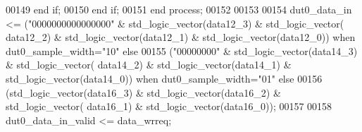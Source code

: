 \begin{DoxyCode}
00149          \textcolor{keywordflow}{end} \textcolor{keywordflow}{if};
00150       \textcolor{keywordflow}{end} \textcolor{keywordflow}{if};
00151    \textcolor{keywordflow}{end} \textcolor{keywordflow}{process};
00152    
00153    
00154    \textcolor{vhdlchar}{dut0_data_in} \textcolor{vhdlchar}{<=}   \textcolor{vhdlchar}{(}\textcolor{vhdllogic}{"0000000000000000"} \textcolor{vhdlchar}{&} \textcolor{comment}{std\_logic\_vector}\textcolor{vhdlchar}{(}\textcolor{vhdlchar}{data12_3}\textcolor{vhdlchar}{)} \textcolor{vhdlchar}{&} \textcolor{comment}{std\_logic\_vector}\textcolor{vhdlchar}{(}\textcolor{vhdlchar}{
      data12_2}\textcolor{vhdlchar}{)} \textcolor{vhdlchar}{&} \textcolor{comment}{std\_logic\_vector}\textcolor{vhdlchar}{(}\textcolor{vhdlchar}{data12_1}\textcolor{vhdlchar}{)} \textcolor{vhdlchar}{&} \textcolor{comment}{std\_logic\_vector}\textcolor{vhdlchar}{(}\textcolor{vhdlchar}{data12_0}\textcolor{vhdlchar}{)}\textcolor{vhdlchar}{)} \textcolor{keywordflow}{when} \textcolor{vhdlchar}{
      dut0_sample_width}\textcolor{vhdlchar}{=}\textcolor{vhdllogic}{"10"} \textcolor{keywordflow}{else} 
00155                      \textcolor{vhdlchar}{(}\textcolor{vhdllogic}{"00000000"} \textcolor{vhdlchar}{&} \textcolor{comment}{std\_logic\_vector}\textcolor{vhdlchar}{(}\textcolor{vhdlchar}{data14_3}\textcolor{vhdlchar}{)} \textcolor{vhdlchar}{&} \textcolor{comment}{std\_logic\_vector}\textcolor{vhdlchar}{(}\textcolor{vhdlchar}{
      data14_2}\textcolor{vhdlchar}{)} \textcolor{vhdlchar}{&} \textcolor{comment}{std\_logic\_vector}\textcolor{vhdlchar}{(}\textcolor{vhdlchar}{data14_1}\textcolor{vhdlchar}{)} \textcolor{vhdlchar}{&} \textcolor{comment}{std\_logic\_vector}\textcolor{vhdlchar}{(}\textcolor{vhdlchar}{data14_0}\textcolor{vhdlchar}{)}\textcolor{vhdlchar}{)} \textcolor{keywordflow}{when} \textcolor{vhdlchar}{
      dut0_sample_width}\textcolor{vhdlchar}{=}\textcolor{vhdllogic}{"01"} \textcolor{keywordflow}{else} 
00156                      \textcolor{vhdlchar}{(}\textcolor{comment}{std\_logic\_vector}\textcolor{vhdlchar}{(}\textcolor{vhdlchar}{data16_3}\textcolor{vhdlchar}{)} \textcolor{vhdlchar}{&} \textcolor{comment}{std\_logic\_vector}\textcolor{vhdlchar}{(}\textcolor{vhdlchar}{data16_2}\textcolor{vhdlchar}{)} \textcolor{vhdlchar}{&} \textcolor{comment}{std\_logic\_vector}\textcolor{vhdlchar}{(}\textcolor{vhdlchar}{
      data16_1}\textcolor{vhdlchar}{)} \textcolor{vhdlchar}{&} \textcolor{comment}{std\_logic\_vector}\textcolor{vhdlchar}{(}\textcolor{vhdlchar}{data16_0}\textcolor{vhdlchar}{)}\textcolor{vhdlchar}{)}; 
00157   
00158   \textcolor{vhdlchar}{dut0_data_in_valid} \textcolor{vhdlchar}{<=} \textcolor{vhdlchar}{data_wrreq};

\end{DoxyCode}
